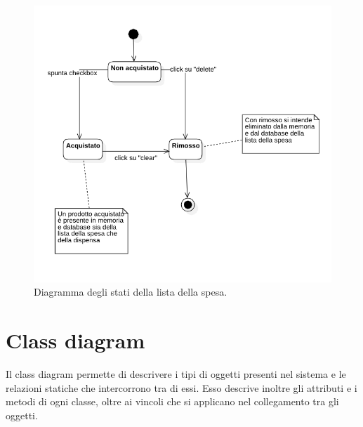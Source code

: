 \begin{figure}[H]
    \includegraphics[width=\linewidth]{images/state-shopping-list.png}
    \caption{Diagramma degli stati della lista della spesa.}
    \label{fig:stateshoplist}
\end{figure}

\newpage

\section{Class diagram}

Il class diagram permette di descrivere i tipi di oggetti presenti nel sistema e le relazioni statiche che intercorrono tra di essi. Esso descrive inoltre gli attributi e i metodi di ogni classe, oltre ai vincoli che si applicano nel collegamento tra gli oggetti.

